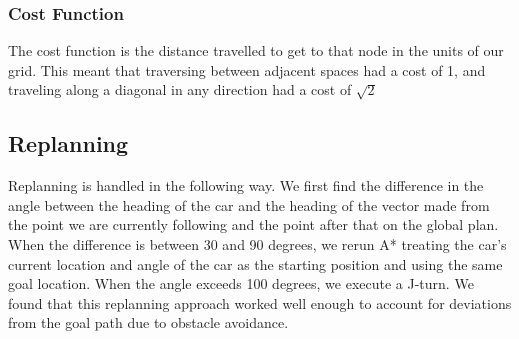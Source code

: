 \subsubsection{Cost Function}
The cost function is the distance travelled to get to that node in the units of our grid. This meant that traversing between adjacent spaces had a cost of 1, and traveling along a diagonal in any direction had a cost of $\sqrt{2}$

\subsection{Replanning}
\label{replan}
Replanning is handled in the following way. We first find the difference in the angle between the heading of the car and the heading of the vector made from the point we are currently following and the point after that on the global plan. When the difference is between 30 and 90 degrees, we rerun A* treating the car's current location and angle of the car as the starting position and using the same goal location. When the angle exceeds 100 degrees, we execute a J-turn. We found that this replanning approach worked well enough to account for deviations from the goal path due to obstacle avoidance.